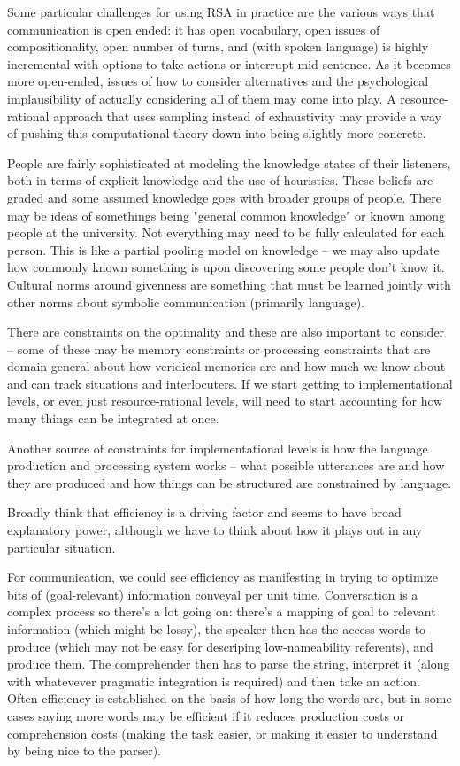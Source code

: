 \documentclass[]{article}
\begin{document}
Some particular challenges for using RSA in practice are the various ways that communication is open ended: it has open vocabulary, open issues of compositionality, open number of turns, and (with spoken language) is highly incremental with options to take actions or interrupt mid sentence. As it becomes more open-ended, issues of how to consider alternatives and the psychological implausibility of actually considering all of them may come into play. A resource-rational approach that uses sampling instead of exhaustivity may provide a way of pushing this computational theory down into being slightly more concrete. 

People are fairly sophisticated at modeling the knowledge states of their listeners, both in terms of explicit knowledge and the use of heuristics. These beliefs are graded and some assumed knowledge goes with broader groups of people. There may be ideas of somethings being "general common knowledge" or known among people at the university. Not everything may need to be fully calculated for each person. This is like a partial pooling model on knowledge -- we may also update how commonly known something is upon discovering some people don't know it. Cultural norms around givenness are something that must be learned jointly with other norms about symbolic communication (primarily language). 





There are constraints on the optimality and these are also important to consider -- some of these may be memory constraints or processing constraints that are domain general about how veridical memories are and how much we know about and can track situations and interlocuters. If we start getting to implementational levels, or even just resource-rational levels, will need to start accounting for how many things can be integrated at once. 

Another source of constraints for implementational levels is how the language production and processing system works -- what possible utterances are and how they are produced and how things can be structured are constrained by language. 

Broadly think that efficiency is a driving factor and seems to have broad explanatory power, although we have to think about how it plays out in any particular situation. 

For communication, we could see efficiency as manifesting in trying to optimize bits of (goal-relevant) information conveyal per unit time. Conversation is a complex process so there's a lot going on: there's a mapping of goal to relevant information (which might be lossy), the speaker then has the access words to produce (which may not be easy for descriping low-nameability referents), and produce them. The comprehender then has to parse the string, interpret it (along with whatevever pragmatic integration is required) and then take an action. Often efficiency is established on the basis of how long the words are, but in some cases saying more words may be efficient if it reduces production costs or comprehension costs (making the task easier, or making it easier to understand by being nice to the parser). 
\end{document}
